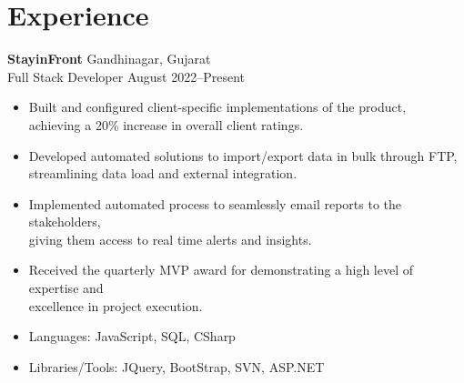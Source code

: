 \documentclass[a4paper,10pt]{article}
\begin{document}

\fancyhead[C]{
}




\section{Experience}
\noindent
\textbf{StayinFront} \hfill Gandhinagar, Gujarat \\
Full Stack Developer \hfill August 2022--Present
\begin{itemize}
    \item Built and configured client-specific implementations of the product, \\
          achieving a 20\% increase in overall client ratings.
    \item Developed automated solutions to import/export data in bulk through FTP, \\
          streamlining data load and external integration.
    \item Implemented automated process to seamlessly email reports to the stakeholders, \\
          giving them access to real time alerts and insights.
    \item Received the quarterly MVP award for demonstrating a high level of expertise and \\ excellence in project execution.
    \item Languages: JavaScript, SQL, CSharp
    \item Libraries/Tools: JQuery, BootStrap, SVN, ASP.NET
\end{itemize}
\end{document}
